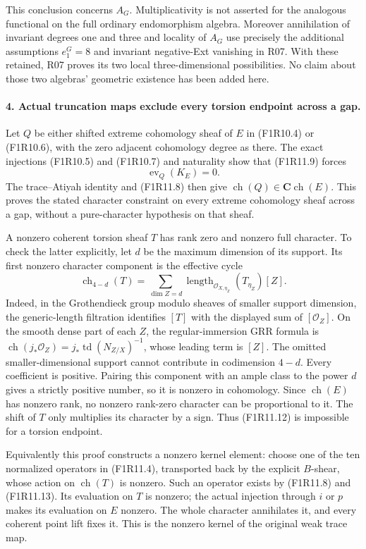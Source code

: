 This conclusion concerns $A_G$. Multiplicativity is not
asserted for the analogous functional on the full ordinary
endomorphism algebra. Moreover annihilation of invariant
degrees one and three and locality of $A_G$ use precisely
the additional assumptions $e_1^G=8$ and invariant
negative-Ext vanishing in R07. With these retained, R07
proves its two local three-dimensional possibilities.
No claim about those two algebras' geometric existence
has been added here.

\paragraph{4. Actual truncation maps exclude every torsion endpoint across a gap.}
Let $Q$ be either shifted extreme cohomology sheaf of $E$
in (F1R10.4) or (F1R10.6), with the zero adjacent
cohomology degree as there. The exact injections
(F1R10.5) and (F1R10.7) and naturality show that
(F1R11.9) forces
\[
              \operatorname{ev}_Q(K_E)=0.
 \tag{F1R11.12}
\]
The trace--Atiyah identity and (F1R11.8) then give
$\operatorname{ch}(Q)\in\mathbf C\operatorname{ch}(E)$.
This proves the stated character constraint on every
extreme cohomology sheaf across a gap, without a
pure-character hypothesis on that sheaf.

A nonzero coherent torsion sheaf $T$ has rank zero and
nonzero full character. To check the latter explicitly,
let $d$ be the maximum dimension of its support. Its
first nonzero character component is the effective cycle
\[
 \operatorname{ch}_{4-d}(T)
   =\sum_{\dim Z=d}\operatorname{length}_{\mathcal O_{X,\eta_Z}}
                                  (T_{\eta_Z})[Z].
 \tag{F1R11.13}
\]
Indeed, in the Grothendieck group modulo sheaves of smaller
support dimension, the generic-length filtration identifies
$[T]$ with the displayed sum of $[\mathcal O_Z]$. On the
smooth dense part of each $Z$, the regular-immersion GRR
formula is
$\operatorname{ch}(j_*\mathcal O_Z)=j_*\operatorname{td}(N_{Z/X})^{-1}$,
whose leading term is $[Z]$. The omitted smaller-dimensional
support cannot contribute in codimension $4-d$.
Every coefficient is positive. Pairing this component
with an ample class to the power $d$ gives a strictly
positive number, so it is nonzero in cohomology.
Since $\operatorname{ch}(E)$ has nonzero rank, no
nonzero rank-zero character can be proportional to it.
The shift of $T$ only multiplies its character by a
sign. Thus (F1R11.12) is impossible for a torsion endpoint.

Equivalently this proof constructs a nonzero kernel
element: choose one of the ten normalized operators in
(F1R11.4), transported back by the explicit $B$-shear,
whose action on $\operatorname{ch}(T)$ is nonzero.
Such an operator exists by (F1R11.8) and (F1R11.13).
Its evaluation on $T$ is nonzero; the actual injection
through $i$ or $p$ makes its evaluation on $E$ nonzero.
The whole character annihilates it, and every coherent
point lift fixes it. This is the nonzero kernel of the
original weak trace map.

